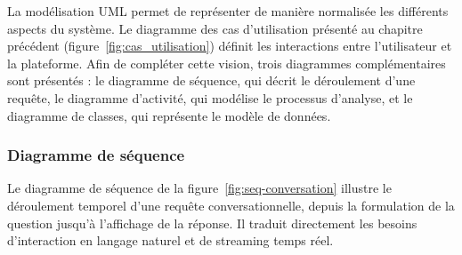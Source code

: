 La modélisation UML permet de représenter de manière normalisée les différents aspects du système. Le diagramme des cas d'utilisation présenté au chapitre précédent (figure~\ref{fig:cas_utilisation}) définit les interactions entre l'utilisateur et la plateforme. Afin de compléter cette vision, trois diagrammes complémentaires sont présentés : le diagramme de séquence, qui décrit le déroulement d'une requête, le diagramme d'activité, qui modélise le processus d'analyse, et le diagramme de classes, qui représente le modèle de données.

\subsubsection{Diagramme de séquence}

Le diagramme de séquence de la figure~\ref{fig:seq-conversation} illustre le déroulement temporel d'une requête conversationnelle, depuis la formulation de la question jusqu'à l'affichage de la réponse. Il traduit directement les besoins d'interaction en langage naturel et de streaming temps réel.

